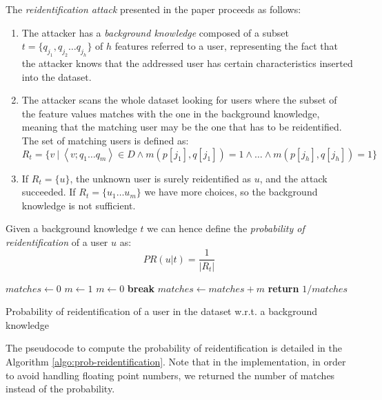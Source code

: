 \documentclass[a4paper]{article}
\begin{document}
The \textit{reidentification attack} presented in the paper proceeds as follows:
\begin{enumerate}
    \item The attacker has a \textit{background knowledge} composed of a subset $t = \{ q_{j_1}, q_{j_2} \dots q_{j_h} \}$ of $h$ features referred to a user, representing the fact that the attacker knows that the addressed user has certain characteristics inserted into the dataset.
    \item The attacker scans the whole dataset looking for users where the subset of the feature values matches with the one in the background knowledge, meaning that the matching user may be the one that has to be reidentified. The set of matching users is defined as:
    $$
        R_t = \{ v\ |\ \left < v; q_1 \dots q_m \right > \in D \land m(p[j_1], q[j_1]) = 1 \land \dots \land m(p[j_h], q[j_h]) = 1 \}
    $$
    \item If $R_t = \{ u \}$, the unknown user is surely reidentified as $u$, and the attack succeeded. If $R_t = \{ u_1 \dots u_m \}$ we have more choices, so the background knowledge is not sufficient.
\end{enumerate}

Given a background knowledge $t$ we can hence define the \textit{probability of reidentification} of a user $u$ as:
$$
    PR(u|t) = \frac{1}{|R_t|}
$$

\begin{algorithm}
    \begin{algorithmic}
            \State $matches \gets 0$
                \State $m \gets 1$
                        \State $m \gets 0$
                        \State \textbf{break}
                    \EndIf
                \EndFor
                \State $matches \gets matches + m$
            \EndFor
            \State \textbf{return} $1 / matches$
        \EndFunction
    \end{algorithmic}
    \caption{Probability of reidentification of a user in the dataset w.r.t. a background knowledge}
    \label{algo:prob-reidentification}
\end{algorithm}

The pseudocode to compute the probability of reidentification is detailed in the Algorithm \ref{algo:prob-reidentification}. Note that in the implementation, in order to avoid handling floating point numbers, we returned the number of matches instead of the probability.
\end{document}
